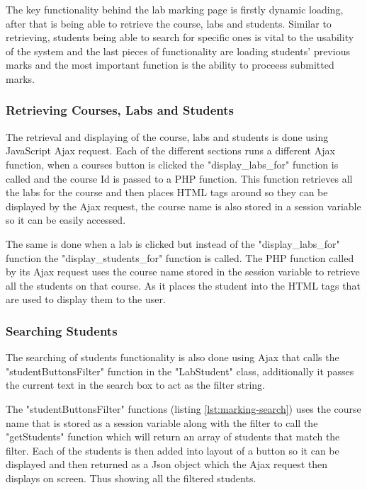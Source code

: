 \documentclass[12pt]{article}  %
\begin{document}
The key functionality behind the lab marking page is firstly dynamic loading, after that is being able to retrieve the course, labs and students. Similar to retrieving, students being able to search for specific ones is vital to the usability of the system and the last pieces of functionality  are loading students' previous marks and the most important function is the ability to proceess submitted marks.

\subsubsection{Retrieving Courses, Labs and Students}

The retrieval and displaying of the course, labs and students is done using JavaScript Ajax request. Each of the different sections runs a different Ajax function, when a courses button is clicked the "display\_labs\_for" function is called and the course Id is passed to a PHP function. This function retrieves all the labs for the course and then places HTML tags around so they can be displayed by the Ajax request, the course name is also stored in a session variable so it can be easily accessed. 

The same is done when a lab is clicked but instead of the "display\_labs\_for" function the "display\_students\_for" function is called. The PHP function called by its Ajax request uses the course name stored in the session variable to retrieve all the students on that course. As it places the student into the HTML tags that are used to display them to the user.


\subsubsection{Searching Students}
The searching of students functionality is also done using Ajax that calls the "studentButtonsFilter" function in the "LabStudent" class, additionally it passes the current text in the search box to act as the filter string. 

The "studentButtonsFilter" functions (listing \ref{lst:marking-search}) uses the course name that is stored as a session variable along with the filter to call the "getStudents" function which will return an array of students that match the filter. Each of the students is then added into layout of a button so it can be displayed and then returned as a Json object which the Ajax request then displays on screen. Thus showing all the filtered students.
\end{document}
